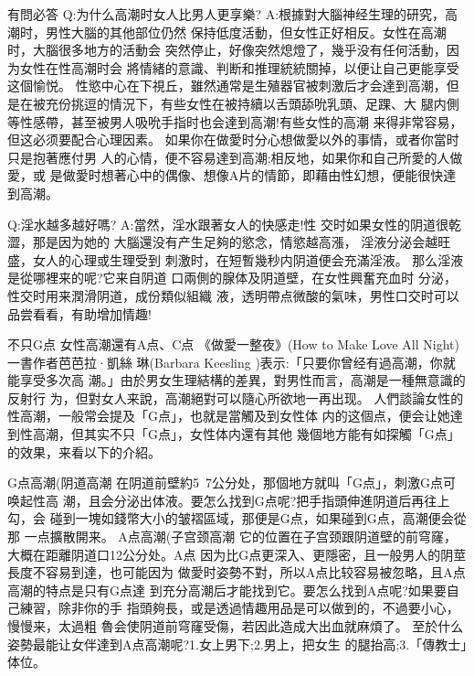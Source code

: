 \documentclass[12pt,UTF8]{ctexbook}
\begin{document}
有問必答
Q:为什么高潮时女人比男人更享樂?
A:根據對大腦神经生理的研究，高潮时，男性大腦的其他部位仍然
保持低度活動，但女性正好相反。女性在高潮时，大腦很多地方的活動会
突然停止，好像突然熄燈了，幾乎没有任何活動，因为女性在性高潮时会
將情緒的意識、判断和推理統統關掉，以便让自己更能享受这個愉悦。
性慾中心在下視丘，雖然通常是生殖器官被刺激后才会達到高潮，但
是在被充份挑逗的情況下，有些女性在被持續以舌頭舔吮乳頭、足踝、大
腿内側等性感帶，甚至被男人吸吮手指时也会達到高潮!有些女性的高潮
来得非常容易，但这必须要配合心理因素。
如果你在做愛时分心想做愛以外的事情，或者你當时只是抱著應付男
人的心情，便不容易達到高潮;相反地，如果你和自己所愛的人做愛，或
是做愛时想著心中的偶像、想像A片的情節，即藉由性幻想，便能很快達
到高潮。

Q:淫水越多越好嗎?
A:當然，淫水跟著女人的快感走!性
交时如果女性的阴道很乾澀，那是因为她的
大腦還没有产生足夠的慾念，情慾越高漲，
淫液分泌会越旺盛，女人的心理或生理受到
刺激时，在短暫幾秒内阴道便会充滿淫液。
那么淫液是從哪裡来的呢?它来自阴道
口兩側的腺体及阴道壁，在女性興奮充血时
分泌，性交时用来潤滑阴道，成份類似組織
液，透明帶点微酸的氣味，男性口交时可以
品尝看看，有助增加情趣!

不只G点
女性高潮還有A点、C点
《做愛一整夜》(How to Make Love All Night)一書作者芭芭拉·凱絲
琳(Barbara Keesling )表示:「只要你曾经有過高潮，你就能享受多次高
潮。」由於男女生理結構的差異，對男性而言，高潮是一種無意識的反射行
为，但對女人来說，高潮絕對可以隨心所欲地一再出现。
人們談論女性的性高潮，一般常会提及「G点」，也就是當觸及到女性体
内的这個点，便会让她達到性高潮，但其实不只「G点」，女性体内還有其他
幾個地方能有如探觸「G点」的效果，来看以下的介紹。

G点高潮(阴道高潮
在阴道前壁約5~7公分处，那個地方就叫「G点」，刺激G点可唤起性高
潮，且会分泌出体液。要怎么找到G点呢?把手指頭伸進阴道后再往上勾，会
碰到一塊如錢幣大小的皱褶區域，那便是G点，如果碰到G点，高潮便会從那
一点擴散開来。
A点高潮(子宫颈高潮
它的位置在子宫颈跟阴道壁的前穹窿，大概在距離阴道口12公分处。A点
因为比G点更深入、更隱密，且一般男人的阴莖長度不容易到達，也可能因为
做愛时姿勢不對，所以A点比较容易被忽略，且A点高潮的特点是只有G点達
到充分高潮后才能找到它。要怎么找到A点呢?如果要自己練習，除非你的手
指頭夠長，或是透過情趣用品是可以做到的，不過要小心，慢慢来，太過粗
魯会使阴道前穹窿受傷，若因此造成大出血就麻煩了。
至於什么姿勢最能让女伴達到A点高潮呢?1.女上男下;2.男上，把女生
的腿抬高;3.「傳教士」体位。
\end{document}

